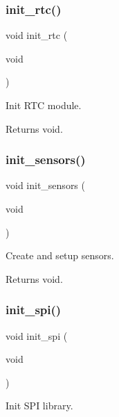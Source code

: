 \subsubsection{\texorpdfstring{init\+\_\+rtc()}{init\_rtc()}}
{\footnotesize\ttfamily void init\+\_\+rtc (\begin{DoxyParamCaption}\item[{void}]{ }\end{DoxyParamCaption})}



Init R\+TC module. 

\begin{DoxyReturn}{Returns}
void. 
\end{DoxyReturn}
\mbox{\label{i2c-rain_8h_ad7577ba7f06f417a019b69da8682ede5}} 
\subsubsection{\texorpdfstring{init\+\_\+sensors()}{init\_sensors()}}
{\footnotesize\ttfamily void init\+\_\+sensors (\begin{DoxyParamCaption}\item[{void}]{ }\end{DoxyParamCaption})}



Create and setup sensors. 

\begin{DoxyReturn}{Returns}
void. 
\end{DoxyReturn}
\mbox{\label{i2c-rain_8h_a4454f968b2402a0e61deb15ab2571dab}} 
\subsubsection{\texorpdfstring{init\+\_\+spi()}{init\_spi()}}
{\footnotesize\ttfamily void init\+\_\+spi (\begin{DoxyParamCaption}\item[{void}]{ }\end{DoxyParamCaption})}



Init S\+PI library. 

